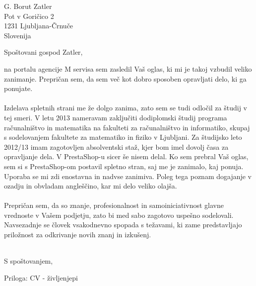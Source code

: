 \documentclass[a4paper]{scrlttr2}
\begin{document}
 
\begin{letter}{G. Borut Zatler \\ Pot v Goričico 2 \\ 1231 Ljubljana-Črnuče \\ Slovenija}
 

\opening{Spoštovani gospod Zatler,}
 
na portalu agencije M servisa sem zasledil Vaš oglas, ki mi je takoj vzbudil veliko zanimanje. Prepričan sem, da sem več kot dobro sposoben opravljati delo, ki ga ponujate. 
\\
\\
 Izdelava spletnih strani me že dolgo zanima, zato sem se tudi odločil za študij v tej smeri. V letu 2013 nameravam zaključiti dodiplomski študij programa računalništvo in matematika na fakulteti za računalništvo in informatiko, skupaj s sodelovanjem fakultete za matematiko in fiziko v Ljubljani. Za študijsko leto 2012/13 imam zagotovljen absolventski staž, kjer bom imel dovolj časa za opravljanje dela. 
V PrestaShop-u sicer še nisem delal. Ko sem prebral Vaš oglas, sem si s PrestaShop-om postavil spletno stran, saj me je zanimalo, kaj ponuja. Uporaba se mi zdi enostavna in nadvse zanimiva. Poleg tega poznam dogajanje v ozadju in obvladam angleščino, kar mi delo veliko olajša.  
\\
\\
Prepričan sem, da so znanje, profesionalnost in samoiniciativnost glavne vrednoste v Vašem podjetju, zato bi med sabo zagotovo uspešno sodelovali. Navsezadnje se človek vsakodnevno spopada s težavami, ki zame predstavljajo priložnost za odkrivanje novih znanj in izkušenj.
\\
\\
\closing{S spoštovanjem,}

\vspace{5mm}


Priloga: CV - življenjepi


 
\end{letter}
 
\end{document}

